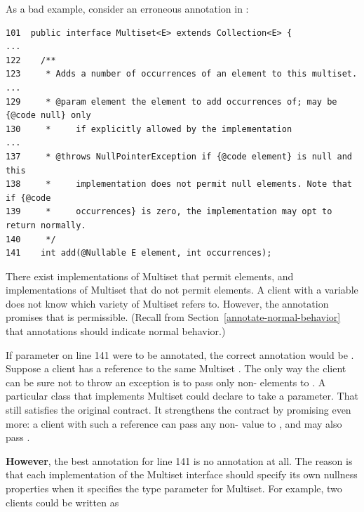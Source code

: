 \begin{sloppypar}
As a bad example, consider an erroneous  annotation in
\href{https://github.com/google/guava/blob/master/guava/src/com/google/common/collect/Multiset.java\#L129}{}:
\end{sloppypar}

\begin{Verbatim}
101  public interface Multiset<E> extends Collection<E> {
...
122    /**
123     * Adds a number of occurrences of an element to this multiset.
...
129     * @param element the element to add occurrences of; may be {@code null} only
130     *     if explicitly allowed by the implementation
...
137     * @throws NullPointerException if {@code element} is null and this
138     *     implementation does not permit null elements. Note that if {@code
139     *     occurrences} is zero, the implementation may opt to return normally.
140     */
141    int add(@Nullable E element, int occurrences);
\end{Verbatim}

There exist implementations of Multiset that permit  elements,
and implementations of Multiset that do not permit  elements.  A
client with a variable  does not know which variety of
Multiset  refers to.  However, the  annotation
promises that  is permissible.  (Recall from
Section~\ref{annotate-normal-behavior} that annotations should indicate
normal behavior.)

If parameter  on line 141 were to be annotated, the correct
annotation would be .  Suppose a client has a reference to
the same Multiset .  The only way the client can be sure not to throw an exception is to pass
only non- elements to .  A particular class
that implements Multiset could declare  to take a
 parameter.  That still satisfies the original contract.
It strengthens the contract by promising even more:  a client with such a
reference can pass any non- value to , and may also
pass .

\textbf{However}, the best annotation for line 141 is no annotation at all.
The reason is that each implementation of the Multiset interface should
specify its own nullness properties when it specifies the type parameter
for Multiset.  For example, two clients could be written as


